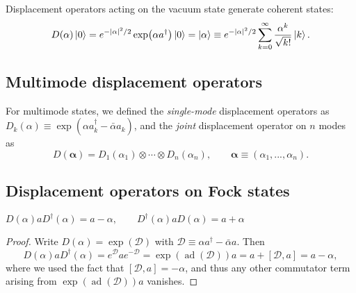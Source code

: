 \documentclass[12pt]{report}
\newcommand{\on}[1]{\operatorname{#1}}
\newcommand{\bs}[1]{\boldsymbol{#1}}
\newcommand{\calD}{{\mathcal{D}}}
\begin{document}
\begin{prop}
	Displacement operators acting on the vacuum state generate coherent states:
	\begin{equation}
		D(\alpha)\ket0 = e^{-|\alpha|^2/2}\exp(\alpha a^\dagger)\ket0
		= \ket\alpha
		\equiv e^{-|\alpha|^2/2} \sum_{k=0}^\infty
			\frac{\alpha^k}{\sqrt{k!}} \ket k.
	\end{equation}
\end{prop}

\subsection{Multimode displacement operators}

\begin{defn}
	For multimode states, we defined the \emph{single-mode} displacement operators as
	$D_k(\alpha)\equiv\exp(\alpha a^\dagger_k-\bar\alpha a_k)$,
	and the \emph{joint} displacement operator on $n$ modes as
	\begin{equation}
		D(\bs\alpha)
		= D_1(\alpha_1)\otimes\cdots\otimes D_n(\alpha_n),
		\qquad \bs\alpha\equiv (\alpha_1,...,\alpha_n).
	\end{equation}
\end{defn}

\subsection{Displacement operators on Fock states}

\begin{prop}
		$D(\alpha) a D^\dagger(\alpha) = a - \alpha,
				\qquad D^\dagger(\alpha) a D(\alpha) = a + \alpha$
\end{prop}
\begin{proof}
	Write $D(\alpha)=\exp(\calD)$ with $\calD\equiv \alpha a^\dagger-\bar\alpha a$.
	Then
	\begin{equation}
		D(\alpha) a D^\dagger(\alpha)
		= e^\calD a e^{-\calD}
		= \exp(\on{ad}(\calD)) a
		= a + [\calD,a] = a-\alpha,
	\end{equation}
	where we used the fact that $[\calD,a]=-\alpha$, and thus any other commutator term arising from $\exp(\on{ad}(\calD))a$ vanishes.
\end{proof}
\end{document}
